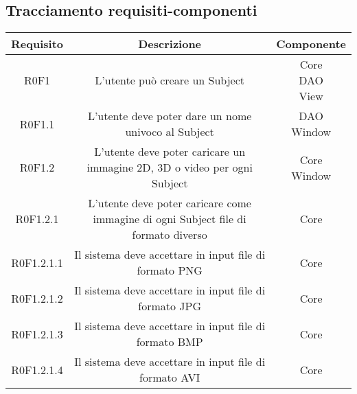 \subsection{Tracciamento requisiti-componenti}
\label{requisiti-componenti}


\newdimen\larghezza
\setlength{\larghezza}{7cm}
\newdimen\dimTipo
\setlength{\dimTipo}{2cm}
\newdimen\dimFonti
\setlength{\dimFonti}{3cm}
	
\begin{center}
\begin{longtable}{|c|c|c|}
\hline

\textbf{Requisito} & \textbf{Descrizione} & \textbf{Componente} \\


\hline
R0F1   & \parbox[t]{\larghezza}{L'utente può creare un Subject}  & \parbox[t]{\dimFonti}{ Core \\ DAO \\ View \\} \\
\hline
R0F1.1   & \parbox[t]{\larghezza}{L'utente deve poter dare un nome univoco al Subject}  & \parbox[t]{\dimFonti}{ DAO \\ Window \\} \\
\hline
R0F1.2   & \parbox[t]{\larghezza}{L'utente deve poter caricare un immagine 2D, 3D o video per ogni Subject}  & \parbox[t]{\dimFonti}{ Core \\ Window \\} \\
\hline
R0F1.2.1   & \parbox[t]{\larghezza}{L'utente deve poter caricare come immagine di ogni Subject file di formato diverso}  & \parbox[t]{\dimFonti}{ Core \\} \\
\hline
R0F1.2.1.1   & \parbox[t]{\larghezza}{Il sistema deve accettare in input file di formato PNG\glossario{}}  & \parbox[t]{\dimFonti}{ Core \\} \\
\hline
R0F1.2.1.2   & \parbox[t]{\larghezza}{Il sistema deve accettare in input file di formato JPG\glossario{}}  & \parbox[t]{\dimFonti}{ Core \\} \\
\hline
R0F1.2.1.3   & \parbox[t]{\larghezza}{Il sistema deve accettare in input file di formato BMP\glossario{}}  & \parbox[t]{\dimFonti}{ Core \\} \\
\hline
R0F1.2.1.4   & \parbox[t]{\larghezza}{Il sistema deve accettare in input file di formato AVI\glossario{}}  & \parbox[t]{\dimFonti}{ Core \\} \\

\end{longtable}
\end{center}
